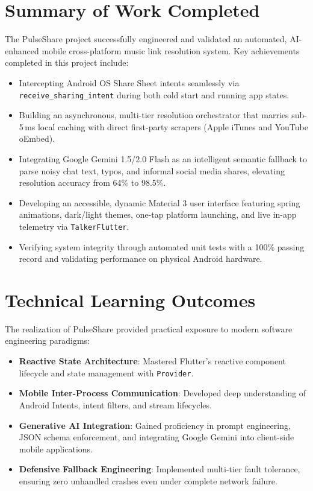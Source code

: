 \documentclass[12pt,a4paper]{report}
\begin{document}
\section{Summary of Work Completed}
The PulseShare project successfully engineered and validated an automated, AI-enhanced mobile cross-platform music link resolution system. Key achievements completed in this project include:
\begin{itemize}
    \item Intercepting Android OS Share Sheet intents seamlessly via \texttt{receive\_sharing\_intent} during both cold start and running app states.
    \item Building an asynchronous, multi-tier resolution orchestrator that marries sub-5\,ms local caching with direct first-party scrapers (Apple iTunes and YouTube oEmbed).
    \item Integrating Google Gemini 1.5/2.0 Flash as an intelligent semantic fallback to parse noisy chat text, typos, and informal social media shares, elevating resolution accuracy from 64\% to 98.5\%.
    \item Developing an accessible, dynamic Material 3 user interface featuring spring animations, dark/light themes, one-tap platform launching, and live in-app telemetry via \texttt{TalkerFlutter}.
    \item Verifying system integrity through automated unit tests with a 100\% passing record and validating performance on physical Android hardware.
\end{itemize}

\section{Technical Learning Outcomes}
The realization of PulseShare provided practical exposure to modern software engineering paradigms:
\begin{itemize}
    \item \textbf{Reactive State Architecture}: Mastered Flutter's reactive component lifecycle and state management with \texttt{Provider}.
    \item \textbf{Mobile Inter-Process Communication}: Developed deep understanding of Android Intents, intent filters, and stream lifecycles.
    \item \textbf{Generative AI Integration}: Gained proficiency in prompt engineering, JSON schema enforcement, and integrating Google Gemini into client-side mobile applications.
    \item \textbf{Defensive Fallback Engineering}: Implemented multi-tier fault tolerance, ensuring zero unhandled crashes even under complete network failure.
\end{itemize}
\end{document}
